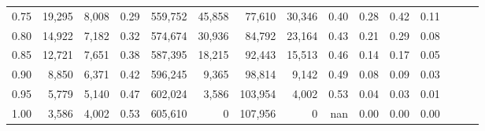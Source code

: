 \begin{tabular}{rrrrrrrrrrrrrrr}
0.75 &  19,295 &  8,008 &  0.29 &  559,752 &   45,858 &   77,610 &   30,346 &  0.40 &  0.28 &  0.42 &      0.11 \\
0.80 &  14,922 &  7,182 &  0.32 &  574,674 &   30,936 &   84,792 &   23,164 &  0.43 &  0.21 &  0.29 &      0.08 \\
0.85 &  12,721 &  7,651 &  0.38 &  587,395 &   18,215 &   92,443 &   15,513 &  0.46 &  0.14 &  0.17 &      0.05 \\
0.90 &   8,850 &  6,371 &  0.42 &  596,245 &    9,365 &   98,814 &    9,142 &  0.49 &  0.08 &  0.09 &      0.03 \\
0.95 &   5,779 &  5,140 &  0.47 &  602,024 &    3,586 &  103,954 &    4,002 &  0.53 &  0.04 &  0.03 &      0.01 \\
1.00 &   3,586 &  4,002 &  0.53 &  605,610 &        0 &  107,956 &        0 &   nan &  0.00 &  0.00 &      0.00 \\
\bottomrule
\end{tabular}
